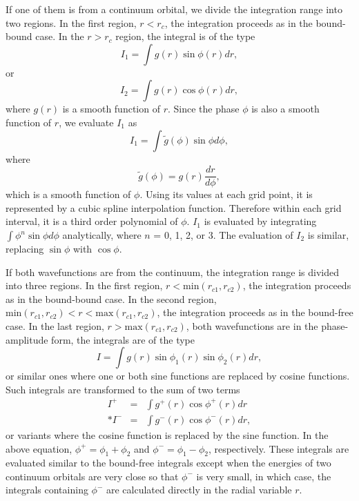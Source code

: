 If one of them is from a continuum orbital, we divide the integration
range into two regions. In the first region, $r < r_c$, the integration
proceeds as in the bound-bound case. In the $r > r_c$ region, the integral is
of the type 
\begin{equation}
I_1 = \int g(r)\sin\phi(r) d r ,
\end{equation}
or 
\begin{equation}
I_2 = \int g(r)\cos\phi(r) d r ,
\end{equation}
where $g(r)$ is a smooth function of $r$. Since the phase $\phi$ is also a
smooth function of $r$, we evaluate $I_1$ as
\begin{equation}
I_1 = \int \tilde{g}(\phi)\sin\phi d\phi,
\end{equation}
where 
\begin{equation}
\tilde{g}(\phi) = g(r)\frac{d r}{d\phi},
\end{equation}
which is a smooth function of $\phi$. Using its values at each grid point, it
is represented by a cubic spline interpolation function. Therefore within each
grid interval, it is a third order polynomial of $\phi$. $I_1$ is evaluated by
integrating $\int \phi^n\sin\phi d\phi$ analytically, where $n$ = 0, 1, 2, or
3.  The evaluation of $I_2$ is similar, replacing $\sin\phi$ with $\cos\phi$. 

If both wavefunctions are from the continuum, the integration range is divided
into three regions. In the first region, $r < \mbox{min}(r_{c1}, r_{c2})$, the
integration proceeds as in the bound-bound case. In the second region,
$\mbox{min}(r_{c1}, r_{c2}) < r < \mbox{max}(r_{c1}, r_{c2})$, the integration
proceeds as in the bound-free 
case. In the last region, $r > \mbox{max}(r_{c1}, r_{c2})$, both wavefunctions
are in the phase-amplitude form, the integrals are of the type 
\begin{equation}
I = \int g(r) \sin\phi_1(r)\sin\phi_2(r) d r,
\end{equation}
or similar ones where one or both sine functions are replaced by cosine
functions. Such integrals are transformed to the sum of two terms
\begin{eqnarray}
I^+ &=& \int g^+(r)\cos\phi^+(r)d r \nonumber \\*
I^- &=& \int g^-(r)\cos\phi^-(r)d r ,
\end{eqnarray}
or variants where the cosine function is replaced by the sine function. In the
above equation, $\phi^+ = \phi_1 + \phi_2$ and $\phi^- = \phi_1 -\phi_2$,
respectively. These 
integrals are evaluated similar to the bound-free integrals except when the
energies of two continuum orbitals are very close so that $\phi^-$ is very
small, in 
which case, the integrals containing $\phi^-$ are calculated directly in the
radial variable $r$. 


